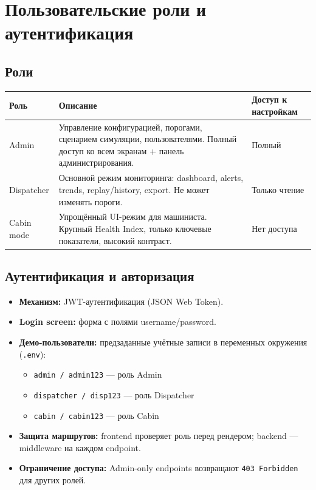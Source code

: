 \documentclass[12pt,a4paper]{article}
\newcommand{\code}[1]{\texttt{#1}}
\begin{document}
\section{Пользовательские роли и аутентификация}

\subsection{Роли}

\begin{tabularx}{\textwidth}{l X l}
\toprule
\textbf{Роль} & \textbf{Описание} & \textbf{Доступ к настройкам} \\
\midrule
Admin & Управление конфигурацией, порогами, сценарием симуляции, пользователями. Полный доступ ко всем экранам + панель администрирования. & Полный \\
\addlinespace
Dispatcher & Основной режим мониторинга: dashboard, alerts, trends, replay/history, export. Не может изменять пороги. & Только чтение \\
\addlinespace
Cabin mode & Упрощённый UI-режим для машиниста. Крупный Health Index, только ключевые показатели, высокий контраст. & Нет доступа \\
\bottomrule
\end{tabularx}

\subsection{Аутентификация и авторизация}

\begin{itemize}[nosep]
  \item \textbf{Механизм:} JWT-аутентификация (JSON Web Token).
  \item \textbf{Login screen:} форма с полями username/password.
  \item \textbf{Демо-пользователи:} предзаданные учётные записи в переменных окружения (\code{.env}):
    \begin{itemize}[nosep]
      \item \code{admin / admin123} --- роль Admin
      \item \code{dispatcher / disp123} --- роль Dispatcher
      \item \code{cabin / cabin123} --- роль Cabin
    \end{itemize}
  \item \textbf{Защита маршрутов:} frontend проверяет роль перед рендером; backend --- middleware на каждом endpoint.
  \item \textbf{Ограничение доступа:} Admin-only endpoints возвращают \code{403 Forbidden} для других ролей.
\end{itemize}
\end{document}
